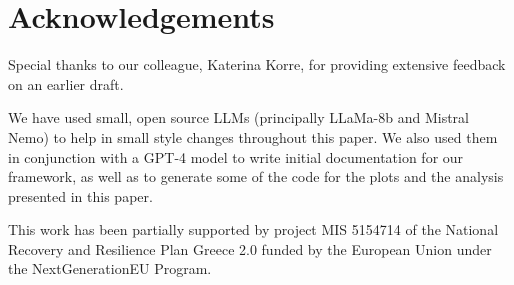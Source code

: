 %
\section*{Acknowledgements}

Special thanks to our colleague, Katerina Korre, for providing extensive feedback on an earlier draft.

We have used small, open source \acp{LLM} (principally LLaMa-8b and Mistral Nemo) to help in small style changes throughout this paper. We also used them in conjunction with a GPT-4 model \cite{openai2024gpt4technicalreport} to write initial documentation for our framework, as well as to generate some of the code for the plots and the analysis presented in this paper. 

This work has been partially supported by project MIS 5154714 of the National Recovery and Resilience Plan Greece 2.0 funded by the European Union under the NextGenerationEU Program.